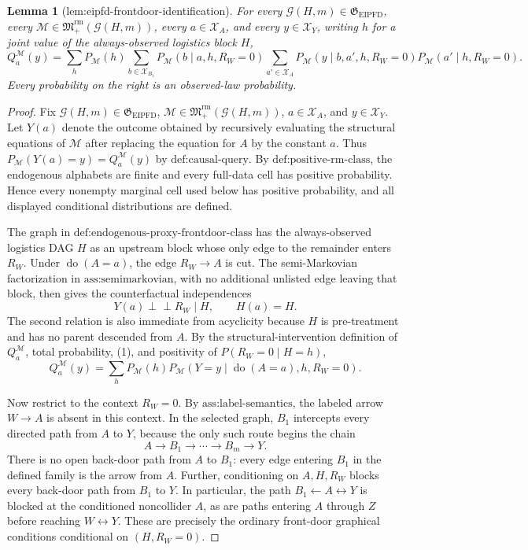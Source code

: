 \documentclass{article}
\newtheorem{lemma}{Lemma}
\begin{document}
\begin{lemma}[lem:eipfd-frontdoor-identification]\label{lem:eipfd-frontdoor-identification}
For every \(\mathcal G(H,m)\in\mathfrak G_{\mathrm{EIPFD}}\), every \(\mathcal M\in\mathfrak M_{+}^{\mathrm{rm}}(\mathcal G(H,m))\), every \(a\in\mathcal X_A\), and every \(y\in\mathcal X_Y\), writing \(h\) for a joint value of the always-observed logistics block \(H\),
\[
Q_a^{\mathcal M}(y)=
\sum_hP_{\mathcal M}(h)
\sum_{b\in\mathcal X_{B_1}}P_{\mathcal M}(b\mid a,h,R_W=0)
\sum_{a'\in\mathcal X_A}P_{\mathcal M}(y\mid b,a',h,R_W=0)
P_{\mathcal M}(a'\mid h,R_W=0).
\]
Every probability on the right is an observed-law probability.
\end{lemma}
\begin{proof}
Fix \(\mathcal G(H,m)\in\mathfrak G_{\mathrm{EIPFD}}\), \(\mathcal M\in\mathfrak M_{+}^{\mathrm{rm}}(\mathcal G(H,m))\), \(a\in\mathcal X_A\), and \(y\in\mathcal X_Y\).  Let \(Y(a)\) denote the outcome obtained by recursively evaluating the structural equations of \(\mathcal M\) after replacing the equation for \(A\) by the constant \(a\).  Thus \(P_{\mathcal M}(Y(a)=y)=Q_a^{\mathcal M}(y)\) by \(\text{def:causal-query}\).  By \(\text{def:positive-rm-class}\), the endogenous alphabets are finite and every full-data cell has positive probability.  Hence every nonempty marginal cell used below has positive probability, and all displayed conditional distributions are defined.

The graph in \(\text{def:endogenous-proxy-frontdoor-class}\) has the always-observed logistics DAG \(H\) as an upstream block whose only edge to the remainder enters \(R_W\).  Under \(\operatorname{do}(A=a)\), the edge \(R_W\to A\) is cut.  The semi-Markovian factorization in \(\text{ass:semimarkovian}\), with no additional unlisted edge leaving that block, then gives the counterfactual independences
\[
Y(a)\mathbin{\perp\!\!\!\perp}R_W\mid H,
\qquad
H(a)=H.
\tag{1}
\]
The second relation is also immediate from acyclicity because \(H\) is pre-treatment and has no parent descended from \(A\).  By the structural-intervention definition of \(Q_a^{\mathcal M}\), total probability, (1), and positivity of \(P(R_W=0\mid H=h)\),
\[
Q_a^{\mathcal M}(y)
=\sum_hP_{\mathcal M}(h)
P_{\mathcal M}(Y=y\mid\operatorname{do}(A=a),h,R_W=0).
\tag{2}
\]

Now restrict to the context \(R_W=0\).  By \(\text{ass:label-semantics}\), the labeled arrow \(W\to A\) is absent in this context.  In the selected graph, \(B_1\) intercepts every directed path from \(A\) to \(Y\), because the only such route begins the chain
\[
A\to B_1\to\cdots\to B_m\to Y.
\tag{3}
\]
There is no open back-door path from \(A\) to \(B_1\): every edge entering \(B_1\) in the defined family is the arrow from \(A\).  Further, conditioning on \(A,H,R_W\) blocks every back-door path from \(B_1\) to \(Y\).  In particular, the path \(B_1\leftarrow A\leftrightarrow Y\) is blocked at the conditioned noncollider \(A\), as are paths entering \(A\) through \(Z\) before reaching \(W\leftrightarrow Y\).  These are precisely the ordinary front-door graphical conditions conditional on \((H,R_W=0)\).


\end{proof}
\end{document}
